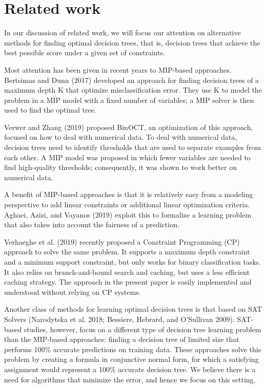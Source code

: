 \section{Related work}
In our discussion of related work, we will focus our attention on alternative methods for finding optimal decision trees, that is, decision trees that achieve the best possible score under a given set of constraints.

Most attention has been given in recent years to MIP-based approaches. Bertsimas and Dunn (2017) developed an approach for finding decision trees of a maximum depth K that optimize misclassification error. They use K to model the problem in a MIP model with a fixed number of variables; a MIP solver is then used to find the optimal tree.

Verwer and Zhang (2019) proposed BinOCT, an optimization of this approach, focused on how to deal with numerical data. To deal with numerical data, decision trees need to identify thresholds that are used to separate examples from each other. A MIP model was proposed in which fewer variables are needed to find high-quality thresholds; consequently, it was shown to work better on numerical data.

A benefit of MIP-based approaches is that it is relatively easy from a modeling perspective to add linear constraints or additional linear optimization criteria. Aghaei, Azizi, and Vayanos (2019) exploit this to formalize a learning problem that also takes into account the fairness of a prediction.

Verhaeghe et al. (2019) recently proposed a Constraint Programming (CP) approach to solve the same problem. It supports a maximum depth constraint and a minimum support constraint, but only works for binary classification tasks. It also relies on branch-and-bound search and caching, but uses a less efficient caching strategy. The approach in the present paper is easily implemented and understood without relying on CP systems.

Another class of methods for learning optimal decision trees is that based on SAT Solvers (Narodytska et al. 2018; Bessiere, Hebrard, and O’Sullivan 2009). SAT-based studies, however, focus on a different type of decision tree learning problem than the MIP-based approaches: finding a decision tree of limited size that performs 100\% accurate predictions on training data. These approaches solve this problem by creating a formula in conjunctive normal form, for which a satisfying assignment would represent a 100\% accurate decision tree. We believe there is a need for algorithms that minimize the error, and hence we focus on this setting.

